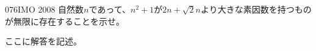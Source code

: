 \begin{prob}{076}{}{IMO 2008}
 自然数$n$であって、$n^2+1$が$2n+\sqrt{2}n$より大きな素因数を持つものが無限に存在することを示せ。
\end{prob}
ここに解答を記述。